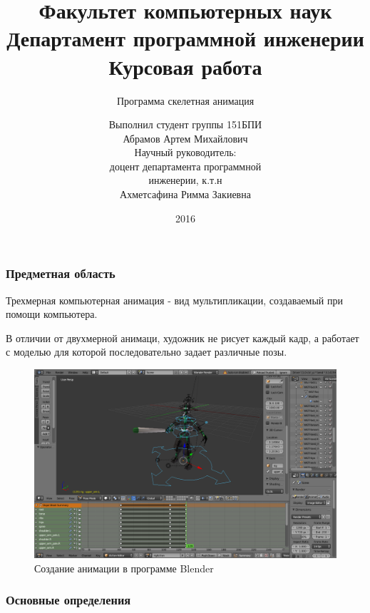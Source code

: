\documentclass{beamer}
\title[Курсовая работа]{\scriptsize{%
Факультет компьютерных наук \\%
Департамент программной инженерии \\%
Курсовая работа \\%
}}
\subtitle{Программа скелетная анимация}
\author[Абрамов Артем 151 БПИ]{\scriptsize{%
Выполнил студент группы 151БПИ \\%
Абрамов Артем Михайлович \\%
Научный руководитель: \\%
доцент департамента программной \\%
инженерии, к.т.н \\%
Ахметсафина Римма Закиевна}}
\date{2016}
\begin{document}

\frame[plain]{\titlepage}	%




\begin{frame}
\frametitle{Предметная область}
\begin{multicols}{2}
\begin{small}
    Трехмерная компьютерная анимация - вид мультипликации, создаваемый при помощи компьютера. 
    \medskip
    
    В отличии от двухмерной анимаци, художник не рисует каждый кадр, а работает с моделью для которой последовательно задает различные позы.
\end{small}

\columnbreak
    
\begin{figure}[h!]
    \centering
    \includegraphics[width=1.15\columnwidth]{blender_at_work.png}
    \caption{Создание анимации в программе Blender}
\end{figure}

\end{multicols}
\end{frame}


\begin{frame}
\frametitle{Основные определения}
    
\end{frame}
\end{document}
